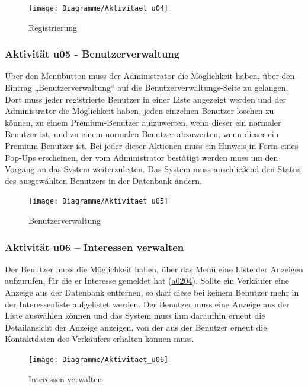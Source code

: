 \documentclass[a4paper,12pt,oneside]{scrartcl}
\begin{document}
\begin{figure}[!htbp]
\centering
\noindent\texttt{[image: Diagramme/Aktivitaet\_u04]}
\caption{Registrierung}
\end{figure}
\FloatBarrier




\subsubsection{Aktivität u05 - Benutzerverwaltung}
Über den Menübutton muss der Administrator die Möglichkeit haben, über den Eintrag „Benutzerverwaltung“ auf die Benutzerverwaltungs-Seite zu gelangen. 
Dort muss jeder registrierte Benutzer in einer Liste angezeigt werden und der Administrator die Möglichkeit haben, jeden einzelnen Benutzer löschen zu können, zu einem Premium-Benutzer aufzuwerten, wenn dieser ein normaler Benutzer ist, und zu einem normalen Benutzer abzuwerten, wenn dieser ein Premium-Benutzer ist. 
Bei jeder dieser Aktionen muss ein Hinweis in Form eines Pop-Ups erscheinen, der vom Administrator bestätigt werden muss um den Vorgang an das System weiterzuleiten. 
Das System muss anschließend den Status des ausgewählten Benutzers in der Datenbank ändern.

\begin{figure}[!htbp]
\centering
\noindent\texttt{[image: Diagramme/Aktivitaet\_u05]}
\caption{Benutzerverwaltung}
\end{figure}
\FloatBarrier


\subsubsection{Aktivität u06 – Interessen verwalten}
Der Benutzer muss die Möglichkeit haben, über das Menü eine Liste der Anzeigen aufzurufen, für die er Interesse gemeldet hat (\hyperlink{u02}{a0204}).
Sollte ein Verkäufer eine Anzeige aus der Datenbank entfernen, so darf diese bei keinem Benutzer mehr in der Interessenliste aufgelistet werden.
Der Benutzer muss eine Anzeige aus der Liste auswählen können und das System muss ihm daraufhin erneut die Detailansicht der Anzeige anzeigen, von der aus der Benutzer erneut die Kontaktdaten des Verkäufers erhalten können muss.

\begin{figure}[!htbp]
\centering
\noindent\texttt{[image: Diagramme/Aktivitaet\_u06]}
\caption{Interessen verwalten}
\end{figure}
\FloatBarrier
\end{document}
